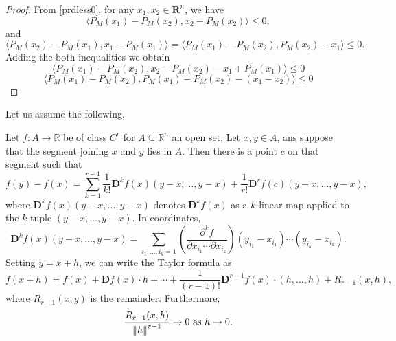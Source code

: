 \begin{proof}
    From \cref{prdless0}, for any $x_1, x_2 \in  \mathbf{R}^n$, we have 
    $$
        \langle P_M(x_1) - P_M(x_2), x_2 - P_M(x_2)\rangle \leq 0,
    $$
    and
    $$
        \langle P_M(x_2) - P_M(x_1), x_1 - P_M(x_1)\rangle = %
        \langle P_M(x_1) - P_M(x_2), P_M(x_2) - x_1\rangle \leq 0.
    $$
    Adding the both inequalities we obtain
    $$
        \langle P_M(x_1) - P_M(x_2), x_2 - P_M(x_2) -x_1 + P_M(x_1)\rangle \leq 0
    $$
    $$
        \langle P_M(x_1) - P_M(x_2), P_M(x_1) - P_M(x_2) - (x_1 -x_2)\rangle \leq 0
    $$
\end{proof}





Let us assume the following,
\begin{theorem}\label{thm:TT}
    Let $f : A \to \mathbb{R}$ be of class $C^{r}$ for $A \subseteq \mathbb{R}^{n}$
    an open set. Let $x,y \in A$, ans suppose that the segment joining $x$ and $y$
    lies in $A$. Then there is a point $c$ on that segment such that
    \begin{equation*}
        f(y) - f(x) = \sum_{k=1}^{r-1}\dfrac{1}{k!}\mathbf{D}^{k}f(x)(y-x,\ldots, y-x)%
        + \dfrac{1}{r!}\mathbf{D}^{r}f(c)(y-x,\ldots, y-x),
    \end{equation*}
    where $\mathbf{D}^{k}f(x)(y-x,\ldots, y-x)$ denotes $\mathbf{D}^{k}f(x)$ as a
    $k$-linear map applied to the $k$-tuple $(y-x,\ldots, y-x)$. In coordinates,
    \begin{equation*}
        \mathbf{D}^{k}f(x)(y-x,\ldots, y-x) = \sum_{i_1, \ldots, i_k  =1}%
        \left(\dfrac{\partial^{k}f}{\partial x_{i_1} \cdots \partial x_{i_k}}\right)%
        \left(y_{i_1} - x_{i_1}\right) \cdots (y_{i_k} - x_{i_k}).
    \end{equation*}
    Setting $y = x + h$, we can write the Taylor formula as
    \begin{equation*}
        f(x+h) = f(x) + \mathbf{D}f(x)\cdot h + \cdots  + \dfrac{1}{(r-1)!}%
        \mathbf{D}^{r-1}f(x)\cdot (h, \ldots, h) + R_{r-1}(x,h),
    \end{equation*}
    where $R_{r-1}(x,y)$ is the remainder. Furthermore,
    \begin{equation*}
        \dfrac{R_{r-1}(x,h)}{\left\lVert h\right\rVert^{r-1}} \to 0 \text{ as } h \to 0. 
    \end{equation*}
\end{theorem}

